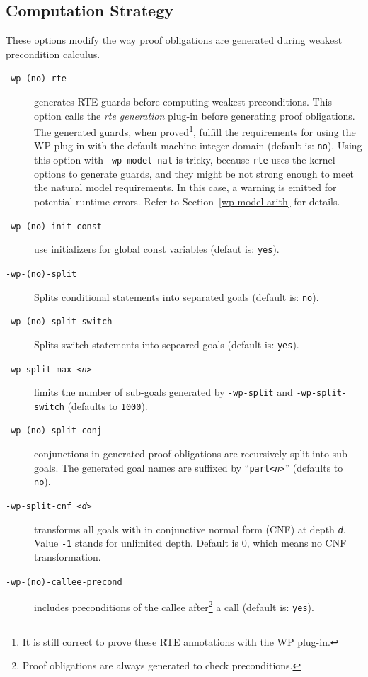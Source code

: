 \subsection{Computation Strategy}
\label{subsec:computation-strategy}

These options modify the way proof obligations are generated during
weakest precondition calculus.

\begin{description}
\item[\tt -wp-(no)-rte] generates RTE guards before computing weakest
  preconditions. This option calls the \emph{rte generation} plug-in
  before generating proof obligations.
  The generated guards, when proved\footnote{It is still correct to prove these RTE
    annotations with the \textsf{WP} plug-in.}, fulfill the requirements for
  using the \textsf{WP} plug-in with the default machine-integer domain (default is: \texttt{no}).
  Using this option with \texttt{-wp-model nat} is tricky, because \texttt{rte} uses the kernel options
  to generate guards, and they might be not strong enough to meet the natural model requirements.
  In this case, a warning is emitted for potential runtime errors.
  Refer to Section~\ref{wp-model-arith} for details.
\item[\tt -wp-(no)-init-const] use initializers for global const variables
  (defaut is: \texttt{yes}).
\item[\tt -wp-(no)-split] Splits conditional statements into separated goals (default is: \texttt{no}).
\item[\tt -wp-(no)-split-switch] Splits switch statements into sepeared goals (default is: \texttt{yes}).
\item[\tt -wp-split-max <{\it n}>]
  limits the number of sub-goals generated by  \verb|-wp-split| and \verb|-wp-split-switch|
  (defaults to \verb+1000+).
\item[\tt -wp-(no)-split-conj] conjunctions in generated proof obligations are
  recursively split into sub-goals.  The generated goal names are
  suffixed by ``{\tt part<{\it n}>}'' (defaults to \texttt{no}).
\item[\tt -wp-split-cnf <{\it d}>] transforms all goals with in conjunctive normal form (CNF) at depth {\tt\it d}.
  Value \verb|-1| stands for unlimited depth. Default is 0, which means no CNF transformation.
\item[\tt -wp-(no)-callee-precond] includes preconditions of the callee
  after\footnote{Proof obligations are always generated to check preconditions.}
  a call (default is: \texttt{yes}).

\end{description}
